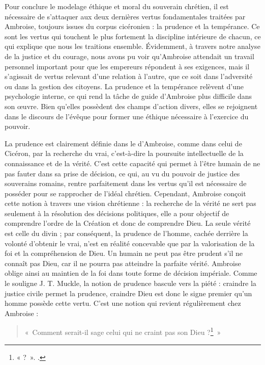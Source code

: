 Pour conclure le modelage éthique et moral du souverain chrétien, il est nécessaire de s'attaquer aux deux dernières vertus fondamentales traitées par Ambroise, toujours issues du corpus cicéronien : la prudence et la tempérance. Ce sont les vertus qui touchent le plus fortement la discipline intérieure de chacun, ce qui explique que nous les traitions ensemble. Évidemment, à travers notre analyse de la justice et du courage, nous avons pu voir qu'Ambroise attendait un travail personnel important pour que les empereurs répondent à ses exigences, mais il s'agissait de vertus relevant d'une relation à l'autre, que ce soit dans l'adversité ou dans la gestion des citoyens. La prudence et la tempérance relèvent d'une psychologie interne, ce qui rend la tâche de guide d'Ambroise plus difficile dans son œuvre. Bien qu'elles possèdent des champs d'action divers, elles se rejoignent dans le discours de l'évêque pour former une éthique nécessaire à l'exercice du pouvoir.

\bigskip

La prudence est clairement définie dans le  d'Ambroise, comme dans celui de Cicéron, par la recherche du vrai, c’est-à-dire la poursuite intellectuelle de la connaissance et de la vérité. C'est cette capacité qui permet à l'être humain de ne pas fauter dans sa prise de décision, ce qui, au vu du pouvoir de justice des souverains romains, rentre parfaitement dans les vertus qu'il est nécessaire de posséder pour se rapprocher de l'idéal chrétien. Cependant, Ambroise conçoit cette notion à travers une vision chrétienne : la recherche de la vérité ne sert pas seulement à la résolution des décisions politiques, elle a pour objectif de comprendre l'ordre de la Création et donc de comprendre Dieu. La seule vérité est celle du divin ; par conséquent, la prudence de l'homme, cachée derrière la volonté d'obtenir le vrai, n'est en réalité concevable que par la valorisation de la foi et la compréhension de Dieu. Un humain ne peut pas être prudent s'il ne connaît pas Dieu, car il ne pourra pas atteindre la parfaite vérité. Ambroise oblige ainsi au maintien de la foi dans toute forme de décision impériale. Comme le souligne J. T. Muckle, la notion de prudence bascule vers la piété : craindre la justice civile permet la prudence, craindre Dieu est donc le signe premier qu'un homme possède cette vertu\autocite[78]{muckle_officiis}. C'est une notion qui revient régulièrement chez Ambroise :

\bigskip

\begin{quote}
«~Comment serait-il sage celui qui ne craint pas son Dieu ?\footnote{« ?~». \cite[\nopp I, 117]{ambroise_devoirs_1}.}~»
\end{quote}

